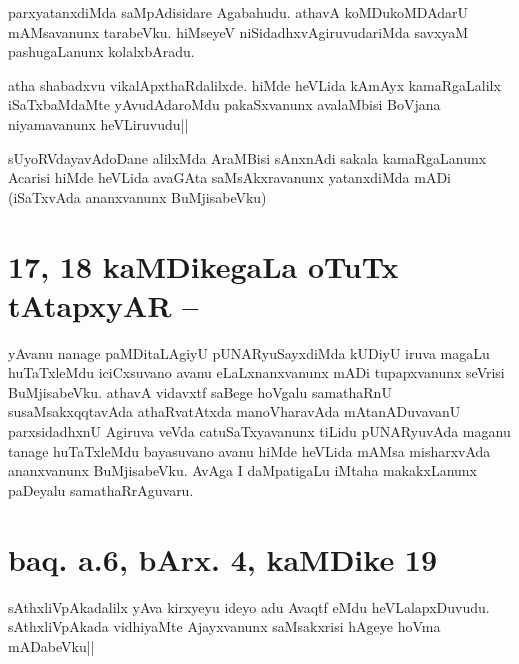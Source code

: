 
\begin{artha}
parxyatanxdiMda saMpAdisidare Agabahudu. athavA koMDukoMDAdarU 
mAMsavanunx tarabeVku. hiMseyeV niSidadhxvAgiruvudariMda savxyaM 
pashugaLanunx kolalxbAradu.
\end{artha}


\begin{artha}
atha shabadxvu vikalApxthaRdalilxde. hiMde heVLida kAmAyx 
kamaRgaLalilx iSaTxbaMdaMte yAvudAdaroMdu pakaSxvanunx avalaMbisi 
BoVjana niyamavanunx heVLiruvudu||
\end{artha}


\begin{artha}
sUyoRVdayavAdoDane alilxMda AraMBisi sAnxnAdi sakala kamaRgaLanunx 
Acarisi hiMde heVLida avaGAta saMsAkxravanunx yatanxdiMda mADi 
(iSaTxvAda ananxvanunx BuMjisabeVku)
\end{artha}

\section*{17, 18 kaMDikegaLa oTuTx tAtapxyAR --}
yAvanu nanage paMDitaLAgiyU pUNARyuSayxdiMda kUDiyU iruva magaLu 
huTaTxleMdu iciCxsuvano avanu eLaLxnanxvanunx mADi tupapxvanunx 
seVrisi BuMjisabeVku. athavA vidavxtf saBege hoVgalu samathaRnU 
susaMsakxqqtavAda athaRvatAtxda manoVharavAda mAtanADuvavanU 
parxsidadhxnU Agiruva veVda catuSaTxyavanunx tiLidu pUNARyuvAda maganu 
tanage huTaTxleMdu bayasuvano avanu hiMde heVLida mAMsa misharxvAda 
ananxvanunx BuMjisabeVku. AvAga I daMpatigaLu iMtaha makakxLanunx 
paDeyalu samathaRrAguvaru.

\section*{baq. a.6, bArx. 4, kaMDike 19}

\stext


\begin{artha}
sAthxliVpAkadalilx yAva kirxyeyu ideyo adu Avaqtf eMdu 
heVLalapxDuvudu. sAthxliVpAkada vidhiyaMte Ajayxvanunx saMsakxrisi 
hAgeye hoVma mADabeVku||
\end{artha}

